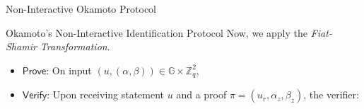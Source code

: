 \documentclass{zkdl-presentation-template}
\begin{document}
    \begin{frame}{Non-Interactive Okamoto Protocol}
        \begin{block}{Okamoto's Non-Interactive Identification Protocol}
            Now, we apply the \textit{Fiat-Shamir Transformation}.\pause
            \begin{itemize}
                \item $\mathsf{Prove}$: On input $(u,(\alpha,\beta)) \in \mathbb{G} \times \mathbb{Z}_q^2$,\pause
                \item $\mathsf{Verify}$: Upon receiving statement $u$ and a proof $\pi=(u_r,\alpha_z,\beta_z)$, the verifier:\pause
            \end{itemize}
        \end{block}
    \end{frame}

    \makeclosingframe
\end{document}
